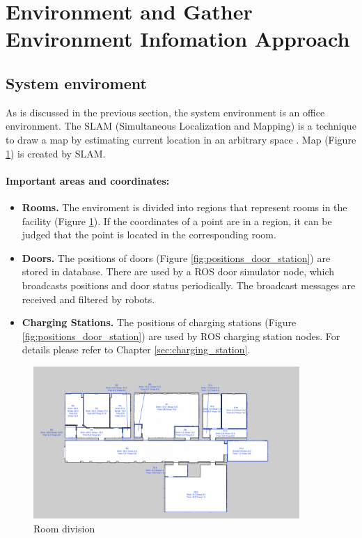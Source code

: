 \section{Environment and Gather Environment Infomation Approach}
\subsection{System enviroment}
\label{sec:system_enviroment}
As is discussed in the previous section, the system environment is an office environment. The SLAM (Simultaneous Localization and Mapping) is a technique to draw a map by estimating current location in an arbitrary space \cite{T3SLAM}. Map (Figure \ref{fig:room_division}) is created by SLAM.

\paragraph{Important areas and coordinates:}
\begin{itemize}
	\item \textbf{Rooms.} The enviroment is divided into regions that represent rooms in the facility (Figure \ref{fig:room_division}). If the coordinates of a point are in a region, it can be judged that the point is located in the corresponding room.
	\item \textbf{Doors.} The positions of doors (Figure \ref{fig:positions_door_station}) are stored in database. There are used by a ROS door simulator node, which broadcasts positions and door status periodically. The broadcast messages are received and filtered by robots.
	\item \textbf{Charging Stations.} The positions of charging stations (Figure \ref{fig:positions_door_station}) are used by ROS charging station nodes. For details please refer to Chapter \ref{sec:charging_station}.
\end{itemize}

\begin{figure}[htbp]
	\centering
	\includegraphics[width = 0.9\textwidth]{content/images/ch3/room_division.png}
	\caption{Room division}
	\label{fig:room_division}
\end{figure}

